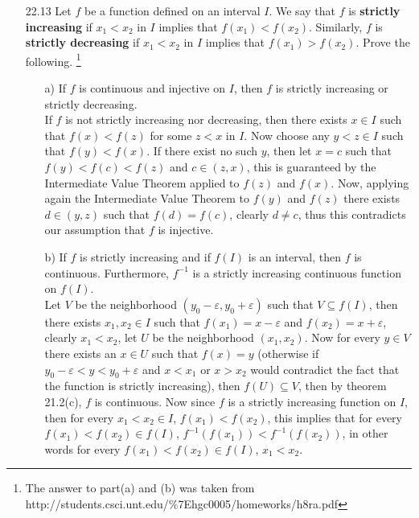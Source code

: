 \documentclass[12pt]{article}
\begin{document}
\begin{enumerate}
\item[22.13] Let $f$ be a function defined on an interval $I$. We say that $f$ is {\bf strictly increasing} if $x_1 < x_2$ in $I$ implies that $f(x_1) < f(x_2)$. Similarly, $f$ is {\bf strictly decreasing} if $x_1 < x_2$ in $I$ implies that $f(x_1) > f(x_2)$. Prove the following.
\footnote{
The answer to part(a) and (b) was taken from\\
http://students.csci.unt.edu/\%7Ehgc0005/homeworks/h8ra.pdf
}
\begin{enumerate}
\item[a)] If $f$ is continuous and injective on $I$, then $f$ is strictly increasing or strictly decreasing. \\
If $f$ is not strictly increasing nor decreasing, then there exists
$x \in I$ such that $f(x) < f(z)$ for some $z < x$ in $I$. Now choose any 
$y < z \in I$ such that $f(y) < f(x)$. If there exist no such $y$, then let
$x = c$ such that $f(y) < f(c) < f(z)$ and $c \in (z, x)$, this is guaranteed
by the Intermediate Value Theorem applied to $f(z)$ and $f(x)$. Now, applying
again the Intermediate Value Theorem to $f(y)$ and $f(z)$ there exists 
$d \in (y, z)$ such that $f(d) = f(c)$, clearly $d \neq c$, thus this 
contradicts our assumption that $f$ is injective.
\item[b)] If $f$ is strictly increasing and if $f(I)$ is an interval, then $f$ is continuous. Furthermore, $f^{-1}$ is a strictly increasing continuous function on $f(I)$. \\
Let $V$ be the neighborhood $(y_0 - \varepsilon, y_0 + \varepsilon)$ 
such that $V \subseteq f(I)$, then there exists $x_1, x_2 \in I$ such that
$f(x_1) = x - \varepsilon$ and $f(x_2) = x + \varepsilon$, 
clearly $x_1 < x_2$, let $U$ be the neighborhood $(x_1, x_2)$. Now for every
$y \in V$ there exists an $x \in U$ such that $f(x) = y$ (otherwise if 
$y_0 - \varepsilon < y < y_0 + \varepsilon$ and $x < x_1$ or $x > x_2$ would
contradict the fact that the function is strictly increasing), then $f(U) 
\subseteq V$, then by theorem 21.2(c), $f$ is continuous. Now since $f$
is a strictly increasing function on $I$, then for every $x_1 < x_2 \in I$, 
$f(x_1) < f(x_2)$, this implies that for every $f(x_1) < f(x_2) \in f(I)$,
$f^{-1}(f(x_1)) < f^{-1}(f(x_2))$, in other words for every
$f(x_1) < f(x_2) \in f(I)$, $x_1 < x_2$.
\end{enumerate}


\end{enumerate}
\end{document}
